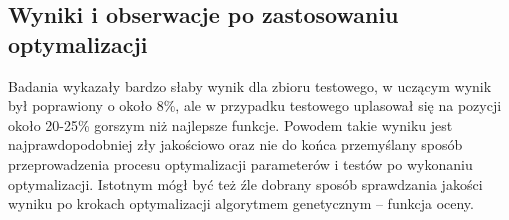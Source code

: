 \subsection{Wyniki i obserwacje po zastosowaniu optymalizacji}
Badania wykazały bardzo słaby wynik dla zbioru testowego, w uczącym wynik był poprawiony o około 8\%, ale w przypadku testowego uplasował się na pozycji około 20-25\% gorszym niż najlepsze funkcje.
Powodem takie wyniku jest najprawdopodobniej zły jakościowo oraz nie do końca przemyślany sposób przeprowadzenia procesu optymalizacji parameterów i testów po wykonaniu optymalizacji.
Istotnym mógł być też źle dobrany sposób sprawdzania jakości wyniku po krokach optymalizacji algorytmem genetycznym -- funkcja oceny.